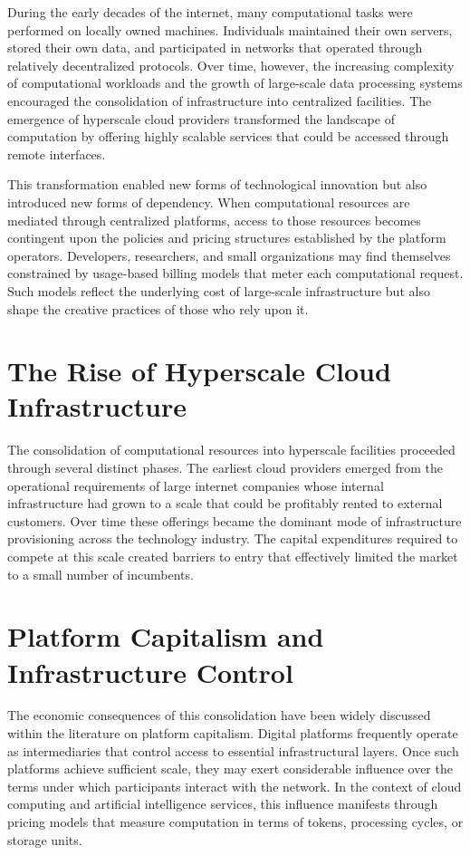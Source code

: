 \documentclass[12pt]{book}
\theoremstyle{definition}
\theoremstyle{remark}
\begin{document}
During the early decades of the internet, many computational tasks
were performed on locally owned machines. Individuals maintained their
own servers, stored their own data, and participated in networks that
operated through relatively decentralized protocols. Over time,
however, the increasing complexity of computational workloads and the
growth of large-scale data processing systems encouraged the
consolidation of infrastructure into centralized facilities. The
emergence of hyperscale cloud providers transformed the landscape of
computation by offering highly scalable services that could be
accessed through remote interfaces.

This transformation enabled new forms of technological innovation but
also introduced new forms of dependency. When computational resources
are mediated through centralized platforms, access to those resources
becomes contingent upon the policies and pricing structures
established by the platform operators. Developers, researchers, and
small organizations may find themselves constrained by usage-based
billing models that meter each computational request. Such models
reflect the underlying cost of large-scale infrastructure but also
shape the creative practices of those who rely upon it.

\section{The Rise of Hyperscale Cloud Infrastructure}

The consolidation of computational resources into hyperscale
facilities proceeded through several distinct phases. The earliest
cloud providers emerged from the operational requirements of large
internet companies whose internal infrastructure had grown to a scale
that could be profitably rented to external customers. Over time these
offerings became the dominant mode of infrastructure provisioning
across the technology industry. The capital expenditures required to
compete at this scale created barriers to entry that effectively
limited the market to a small number of incumbents.

\section{Platform Capitalism and Infrastructure Control}

The economic consequences of this consolidation have been widely
discussed within the literature on platform capitalism. Digital
platforms frequently operate as intermediaries that control access to
essential infrastructural layers. Once such platforms achieve
sufficient scale, they may exert considerable influence over the terms
under which participants interact with the network. In the context of
cloud computing and artificial intelligence services, this influence
manifests through pricing models that measure computation in terms of
tokens, processing cycles, or storage units.
\end{document}
